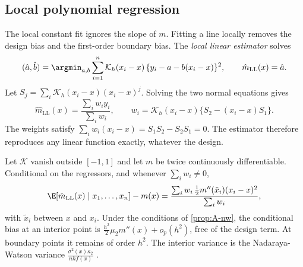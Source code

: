 \subsection{Local polynomial regression}\label{sec:A-loclin}

The local constant fit ignores the slope of $m$. Fitting a line locally removes the design bias and the
first-order boundary bias. The \emph{local linear estimator} solves
\begin{equation}\label{eq:A-loclin}
(\hat a,\hat b)=\argmin_{a,b}\sum_{i=1}^{n}\mathcal{K}_h(x_i-x)\,\{y_i-a-b(x_i-x)\}^2,\qquad
\hat m_{\mathrm{LL}}(x)=\hat a .
\end{equation}
Let $S_j=\sum_i\mathcal{K}_h(x_i-x)(x_i-x)^j$. Solving the two normal equations gives
\begin{equation}\label{eq:A-loclin-weights}
\hat m_{\mathrm{LL}}(x)=\frac{\sum_iw_iy_i}{\sum_iw_i},\qquad w_i=\mathcal{K}_h(x_i-x)\{S_2-(x_i-x)S_1\}.
\end{equation}
The weights satisfy $\sum_iw_i(x_i-x)=S_1S_2-S_2S_1=0$. The estimator therefore reproduces any linear
function exactly, whatever the design.

\begin{proposition}\label{prop:A-loclin}
Let $\mathcal{K}$ vanish outside $[-1,1]$ and let $m$ be twice continuously differentiable. Conditional
on the regressors, and whenever $\sum_iw_i\ne0$,
\begin{equation*}
\E[\hat m_{\mathrm{LL}}(x)\mid x_1,\dots,x_n]-m(x)=\frac{\sum_iw_i\,\frac{1}{2}m''(\tilde x_i)(x_i-x)^2}{\sum_iw_i},
\end{equation*}
with $\tilde x_i$ between $x$ and $x_i$. Under the conditions of \cref{prop:A-nw}, the conditional bias at an
interior point is $\frac{h^2}{2}\mu_2m''(x)+o_p(h^2)$, free of the design term. At boundary points it remains of order
$h^2$. The interior variance is the Nadaraya-Watson variance $\frac{\sigma^2(x)\kappa_2}{nhf(x)}$
\citep{FanGijbels1996}.
\end{proposition}

